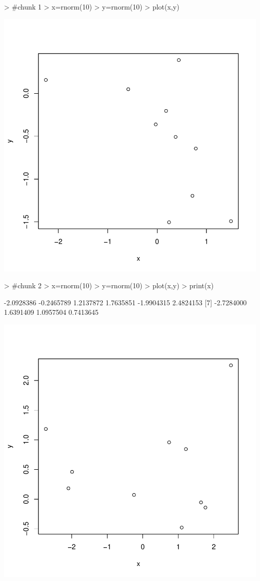 \documentclass{article}
\begin{document}
\begin{Schunk}
\begin{Sinput}
> #chunk 1
> x=rnorm(10)
> y=rnorm(10)
> plot(x,y)
\end{Sinput}
\end{Schunk}
\includegraphics{Demo_Cory-chunk_name}

\begin{Schunk}
\begin{Sinput}
> #chunk 2
> x=rnorm(10)
> y=rnorm(10)
> plot(x,y)
> print(x)
\end{Sinput}
\begin{Soutput}
 [1] -2.0928386 -0.2465789  1.2137872  1.7635851 -1.9904315  2.4824153
 [7] -2.7284000  1.6391409  1.0957504  0.7413645
\end{Soutput}
\end{Schunk}
\includegraphics{Demo_Cory-chunk_name1_5}
\end{document}
